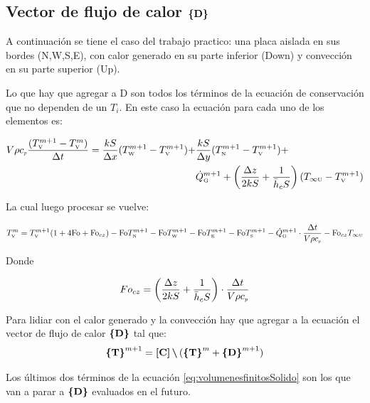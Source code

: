 \documentclass[11pt, titlepage]{article}
\begin{document}
\subsection[Vector de flujo de calor]{Vector de flujo de calor \(\boldsymbol{\{ } \boldsymbol{ \mathrm{D} } \boldsymbol{\} }\)}
A continuación se tiene el caso del trabajo practico: una placa aislada en sus bordes (N,W,S,E), con calor generado en su parte inferior (Down) y convección en su parte superior (Up). 

Lo que hay que agregar a D son todos los términos de la ecuación de conservación que no dependen de un $T_i$. En este caso la ecuación para cada uno de los elementos es:

\begin{align*} \label{eq:volumenesFinitos3Dejemplo}
    V \rho {c_{\textit{\tiny p}}} \frac{(T_{\text{\tiny V}}^{m+1} - T_{\text{\tiny V}}^m )}{\Delta t} =\frac{kS}{\Delta x}(T_{\text{\tiny W}}^{m+1} - T_{\text{\tiny V}}^{m+1}) + &\frac{kS}{\Delta y} (T_{\text{\tiny N}}^{m+1} - T_{\text{\tiny V}}^{m+1}) +\\ &{\dot{Q}_{\text{\tiny G}}}^{m+1} + \left( \frac{\Delta z}{2 k S} + \frac{1}{\bar{h}_{c} S}\right) ( T_{\infty{\ensuremath{\text{\tiny U}}}} - T_{\text{\tiny V}}^{m+1})
\end{align*}

La cual luego procesar se vuelve: 

\begin{equation} \label{eq:volumenesfinitosSolidoConZ}
    T_{\text{\tiny V}}^m = T_{\text{\tiny V}}^{m+1}(1+4{\mathrm{Fo}}+{\mathrm{Fo}}_{cz}) - {\mathrm{Fo}} T_{\text{\tiny N}}^{m+1} - {\mathrm{Fo}} T_{\text{\tiny W}}^{m+1} - {\mathrm{Fo}} T_{\text{\tiny E}}^{m+1} - {\mathrm{Fo}} T_{\text{\tiny S}}^{m+1} - {\dot{Q}_{\text{\tiny G}}}^{m+1}\cdot\frac{\Delta t}{V \rho {c_{\textit{\tiny p}}}} - {\mathrm{Fo}}_{cz} T_{\infty{\ensuremath{\text{\tiny U}}}}
\end{equation}

Donde 

\[Fo_{cz} = \left( \frac{\Delta z}{2 k S} + \frac{1}{\bar{h}_{c} S}\right)\cdot \frac{\Delta t}{V \rho {c_{\textit{\tiny p}}}}\]

Para lidiar con el calor generado y la convección hay que agregar a la ecuación el vector de flujo de calor $\boldsymbol{\{ } \boldsymbol{ \mathrm{D} } \boldsymbol{\} }$ tal que:
\begin{equation}\label{eq:solver}
\boldsymbol{\{ } \boldsymbol{ \mathrm{T} } \boldsymbol{\} }^{m+1} =    \boldsymbol{[ } \boldsymbol{ \mathrm{C} } \boldsymbol{] } \,{\boldsymbol{\backslash}}\, (\boldsymbol{\{ } \boldsymbol{ \mathrm{T} } \boldsymbol{\} }^{m} + \boldsymbol{\{ } \boldsymbol{ \mathrm{D} } \boldsymbol{\} }^{m+1})
\end{equation}

Los últimos dos términos de la ecuación \ref{eq:volumenesfinitosSolido} son los que van a parar a $\boldsymbol{\{ } \boldsymbol{ \mathrm{D} } \boldsymbol{\} }$ evaluados en el futuro.
\end{document}

